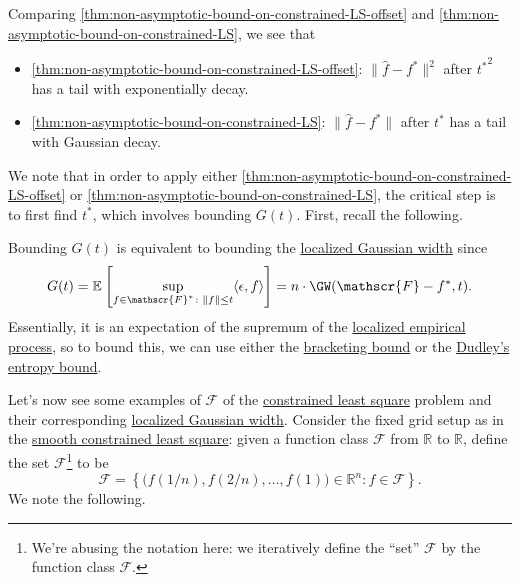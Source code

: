 \begin{remark}
	Comparing \autoref{thm:non-asymptotic-bound-on-constrained-LS-offset} and \autoref{thm:non-asymptotic-bound-on-constrained-LS}, we see that
	\begin{itemize}
		\item \autoref{thm:non-asymptotic-bound-on-constrained-LS-offset}: \(\lVert \hat{f} - f^{\ast}  \rVert ^2\) after \({t^{\ast} }^2\) has a tail with exponentially decay.
		\item \autoref{thm:non-asymptotic-bound-on-constrained-LS}: \(\lVert \hat{f} - f^{\ast}  \rVert \) after \(t^{\ast} \) has a tail with Gaussian decay.
	\end{itemize}
\end{remark}

We note that in order to apply either \autoref{thm:non-asymptotic-bound-on-constrained-LS-offset} or \autoref{thm:non-asymptotic-bound-on-constrained-LS}, the critical step is to first find \(t^{\ast} \), which involves bounding \(G(t)\). First, recall the following.

\begin{prev}
	Bounding \(G(t)\) is equivalent to bounding the \hyperref[def:localized-Gaussian-width]{localized Gaussian width} since
	\[
		G(t)
		= \mathbb{E}_{}\left[\sup _{f\in \mathscr{F} ^{\ast} \colon \lVert f \rVert \leq t} \langle \epsilon , f \rangle \right]
		= n \cdot \GW(\mathscr{F} - f^{\ast} , t).
	\]
	Essentially, it is an expectation of the supremum of the \hyperref[def:localized-EP]{localized empirical process}, so to bound this, we can use either the \hyperref[thm:bracketing-bound]{bracketing bound} or the \hyperref[thm:Dudley-entropy-bound]{Dudley's entropy bound}.
\end{prev}

Let's now see some examples of \(\mathscr{F} \) of the \hyperref[prb:constrained-LS]{constrained least square} problem and their corresponding \hyperref[def:localized-Gaussian-width]{localized Gaussian width}. Consider the fixed grid setup as in the \hyperref[prb:smooth-LS]{smooth constrained least square}: given a function class \(\mathscr{F} \) from \(\mathbb{R} \) to \(\mathbb{R} \), define the set \(\mathscr{F} \)\footnote{We're abusing the notation here: we iteratively define the ``set'' \(\mathscr{F} \) by the function class \(\mathscr{F} \).} to be
\[
	\mathscr{F} = \left\{ \big( f(1 / n), f(2 / n), \dots , f(1) \big) \in \mathbb{R} ^n \colon f \in \mathscr{F} \right\} .
\]
We note the following.

